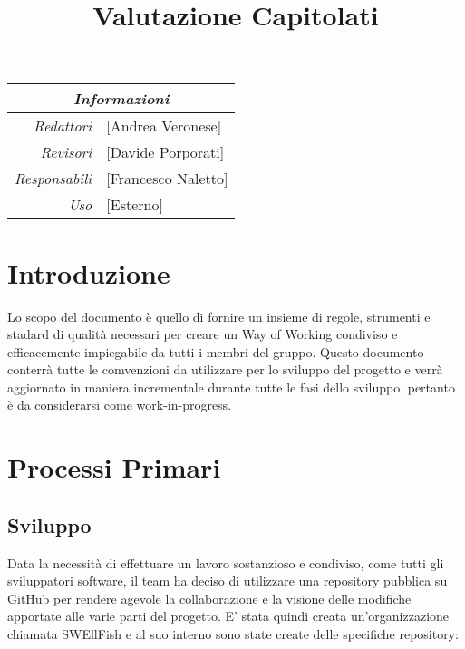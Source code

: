 \documentclass[12pt]{article}
\begin{document}
\graphicspath{ {../templates/img/} }


\title{Valutazione Capitolati}

\firstPage
\maketitle


\begin{center}
    \begin{tabular}{r | l}
		\multicolumn{2}{c}{\textit{Informazioni}}\\
		\hline
		
			\textit{Redattori} &
			[Andrea Veronese]\makecell{}\\
		
			\textit{Revisori} &
			[Davide Porporati]\makecell{}\\
			\textit{Responsabili} &
			[Francesco Naletto]\makecell{}\\
		      \textit{Uso} & 
                [Esterno]\makecell{}\\
\end{tabular}
\end{center}


\tableofcontents
\printindex 
\section{Introduzione}
Lo scopo del documento è quello di fornire un insieme di regole, strumenti e stadard di qualità necessari per creare un Way of Working condiviso e efficacemente impiegabile da tutti i membri del gruppo.
Questo documento conterrà tutte le comvenzioni da utilizzare per lo sviluppo del progetto e verrà aggiornato in maniera incrementale durante tutte le fasi dello sviluppo, pertanto è da considerarsi come work-in-progress.


\section{Processi Primari}
\subsection{Sviluppo}
Data la necessità di effettuare un lavoro sostanzioso e condiviso, come tutti gli sviluppatori software, il team ha deciso di utilizzare una repository pubblica su GitHub per rendere agevole la collaborazione e la visione delle modifiche apportate alle varie parti del progetto.
E' stata quindi creata un'organizzazione chiamata SWEllFish e al suo interno sono state create delle specifiche repository:
\end{document}
